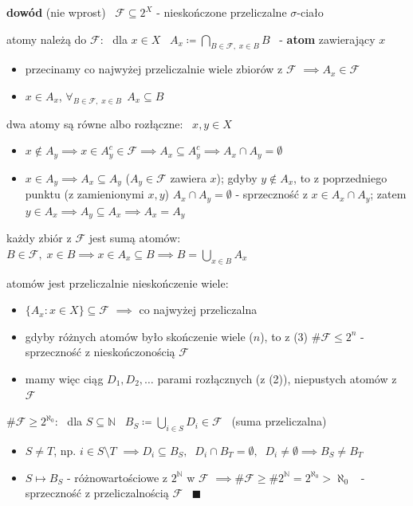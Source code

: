 \documentclass[a4paper,12pt]{article}
\begin{document}
\smallskip
\textbf{dowód} \; (nie wprost) \, \(\mathcal{F} \subseteq 2^X\) - nieskończone przeliczalne \(\sigma\)-ciało
\begin{steps}
    \item atomy należą do \(\mathcal{F}\): \, dla \(x \in X\) \, \(A_x \coloneqq \bigcap_{B \in \mathcal{F}, \; x \in B} B\) \, - \textbf{atom} zawierający \(x\)
    \begin{itemize}
        \item przecinamy co najwyżej przeliczalnie wiele zbiorów z \(\mathcal{F}\) \(\implies A_x \in \mathcal{F}\)
        \item \(x \in A_x\), \; \(\forall_{B \in \mathcal{F}, \; x \in B} \;\, A_x \subseteq B\)
    \end{itemize}
    \item dwa atomy są równe albo rozłączne: \, \(x, y \in X\)
    \begin{itemize}
        \item \(x \notin A_y \implies x \in A_y^c \in \mathcal{F} \implies A_x \subseteq A_y^c \implies A_x \cap A_y = \emptyset\)
        \item \(x \in A_y \implies A_x \subseteq A_y\) (\(A_y \in \mathcal{F}\) zawiera \(x\)); \; gdyby \(y \notin A_x\), to z poprzedniego punktu (z zamienionymi \(x, y\)) \(A_x \cap A_y = \emptyset\) - sprzeczność z \(x \in A_x \cap A_y\); \; zatem \(y \in A_x \implies A_y \subseteq A_x \implies A_x = A_y\)
    \end{itemize}
    \item każdy zbiór z \(\mathcal{F}\) jest sumą atomów: \, \(B \in \mathcal{F}, \; x \in B \implies x \in A_x \subseteq B \implies B = \bigcup_{x \in B} A_x\)
    \item atomów jest przeliczalnie nieskończenie wiele:
    \begin{itemize}
        \item \(\{A_x : x \in X\} \subseteq \mathcal{F}\) \(\implies\) co najwyżej przeliczalna
        \item gdyby różnych atomów było skończenie wiele (\(n\)), to z (3) \(\#\mathcal{F} \leq 2^n\) - sprzeczność z nieskończonością \(\mathcal{F}\)
        \item mamy więc ciąg \(D_1, D_2, \dots\) parami rozłącznych (z (2)), niepustych atomów z \(\mathcal{F}\)
    \end{itemize}
    \item \(\#\mathcal{F} \geq 2^{\aleph_0}\): \, dla \(S \subseteq \mathbb{N}\) \, \(B_S \coloneqq \bigcup_{i \in S} D_i \in \mathcal{F}\) \, (suma przeliczalna)
    \begin{itemize}
        \item \(S \neq T\), np. \(i \in S \setminus T\) \(\implies D_i \subseteq B_S, \;\; D_i \cap B_T = \emptyset, \;\; D_i \neq \emptyset \implies B_S \neq B_T\)
        \item \(S \mapsto B_S\) - różnowartościowe z \(2^{\mathbb{N}}\) w \(\mathcal{F}\) \(\implies \#\mathcal{F} \geq \#2^{\mathbb{N}} = 2^{\aleph_0} > \aleph_0\) \, - sprzeczność z przeliczalnością \(\mathcal{F}\) \, \(\blacksquare\)
    \end{itemize}
\end{steps}
\end{document}
